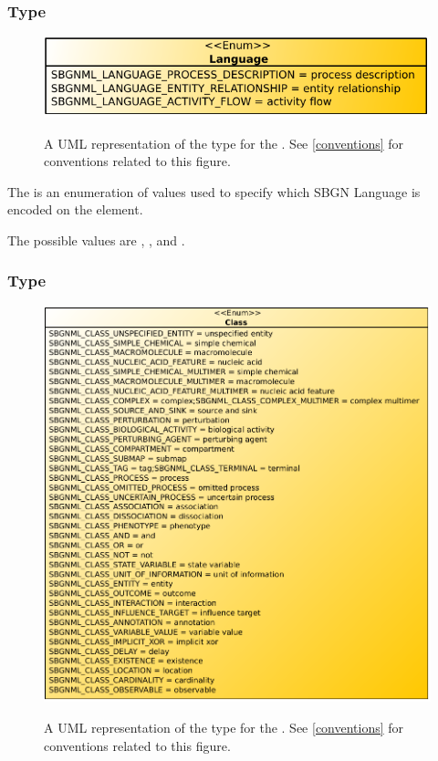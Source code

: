 \subsubsection{Type \fixttspace{}}

\begin{figure}[ht!]
  \centering
  \includegraphics[scale=0.7]{figures/sbgnml_type_enum_language_uml.pdf}\\
\caption{A UML representation of the \Language type for the
\SbgnmlPackage. See \ref{conventions} for conventions related to this
figure. }
  \label{fig:sbgnml_type_enum_language_uml}
\end{figure}


The  is an enumeration of values used to specify which SBGN Language is encoded on the \Map element.

The possible values are , , and .

\subsubsection{Type \fixttspace{}}

\begin{figure}[ht!]
  \centering
  \includegraphics[scale=0.7]{figures/sbgnml_type_enum_class_uml.pdf}\\
\caption{A UML representation of the \Class type for the \SbgnmlPackage.
See \ref{conventions} for conventions related to this figure. }
  \label{fig:sbgnml_type_enum_class_uml}
\end{figure}


